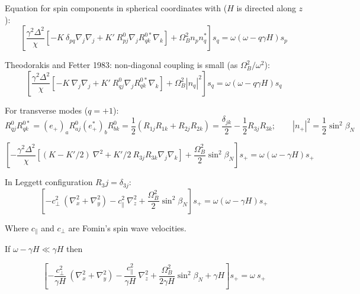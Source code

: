 \documentclass[a4paper]{article}
\begin{document}
Equation for spin components in spherical coordinates with
($H$ is directed along $z$):
$$
\left[
\frac{\gamma^2\Delta^2}{\chi}
  [-K\ \delta_{pq} \nabla_j\nabla_j
 + K'\ R^0_{pj}\nabla_j R^{0*}_{qk}\nabla_k]
+ \Omega_B^2 n_p n_q^*
\right] s_q =
\omega(\omega-q\gamma H) s_p
$$

Theodorakis and Fetter 1983: non-diagonal coupling is small
(as $\Omega_B^2/\omega^2$):
$$
\left[
\frac{\gamma^2\Delta^2}{\chi}
  [-K\ \nabla_j\nabla_j
 + K'\ R^0_{qj}\nabla_j R^{0*}_{qk}\nabla_k]
+ \Omega_B^2 |n_q|^2
\right] s_q =
\omega(\omega-q\gamma H) s_q
$$

For transverse modes ($q=+1$):
$$
R^0_{qj} R^{0*}_{qk}
= (e_{+})_a R^0_{aj} (e_{+}^*)_b R^{0}_{bk}
= \frac12 (R_{1j}R_{1k}+R_{2j}R_{2k})
= \frac{\delta_{jk}}{2}  - \frac12 R_{3j}R_{3k};
\qquad
|n_{+}|^2 = \frac12 \sin^2\beta_N
$$

$$
\left[ -
\frac{\gamma^2\Delta^2}{\chi}
  \left[(K-K'/2)\ \nabla^2
  + K'/2\ R_{3j}R_{3k} \nabla_j\nabla_k
  \right]
+ \frac{\Omega_B^2}{2} \sin^2\beta_N
\right] s_{+} =
\omega(\omega-\gamma H) s_{+}
$$

In Leggett configuration $R_3j = \delta_{3j}$:
$$
\left[
- {c_\perp^2}\ (\nabla_x^2+\nabla_y^2)
- {c_\parallel^2}\ \nabla_z^2
+ \frac{\Omega_B^2}{2} \sin^2\beta_N
\right] s_{+} =
\omega(\omega-\gamma H) s_{+}
$$

Where $c_\parallel$ and $c_\perp$ are Fomin's spin wave velocities.

If $\omega-\gamma H \ll \gamma H$ then

$$
\left[
- \frac{c_\perp^2}{\gamma H}\ (\nabla_x^2+\nabla_y^2)
- \frac{c_\parallel^2}{\gamma H}\ \nabla_z^2
+ \frac{\Omega_B^2}{2\gamma H} \sin^2\beta_N + \gamma H
\right] s_{+} =
\omega\ s_{+}
$$
\end{document}
